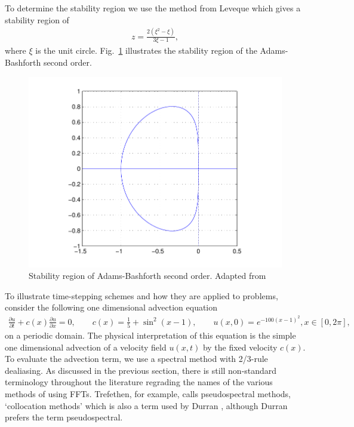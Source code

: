To determine the stability region we use the method from Leveque \cite{leveque} which gives a stability region of
\begin{align}
z = \frac{2(\xi^{2}-\xi)}{3\xi -1},
\end{align}
where $\xi$ is the unit circle. Fig.~\ref{ab_stab} illustrates the stability region of the Adams-Bashforth second order.
\begin{figure}
\begin{center}
\includegraphics[width=\textwidth]{ab_stab}
\caption{Stability region of Adams-Bashforth second order. Adapted from \cite{trefethen_spectral}}
\label{ab_stab}
\end{center}
\end{figure}

To illustrate time-stepping schemes and how they are applied to problems, consider the following one dimensional advection equation \cite{trefethen_spectral}
\begin{align}
\frac{\partial u}{\partial t} + c(x)\frac{\partial u}{\partial x} = 0,\qquad c(x)=\frac{1}{5}+\sin^{2}(x-1), \qquad u(x,0)=e^{-100(x-1)^{2}}, x\in[0,2\pi],
\end{align}
 on a periodic domain. The physical interpretation of this equation is the simple one dimensional advection of a velocity field $u(x,t)$ by the fixed velocity $c(x)$. To evaluate the advection term, we use a spectral method with 2/3-rule dealiasing. As discussed in the previous section, there is still non-standard terminology throughout the literature regrading the names of the various methods of using FFTs. Trefethen, for example, calls pseudospectral methods, `collocation methods' \cite{trefethen_spectral} which is also a term used by Durran \cite{durran}, although Durran prefers the term pseudospectral.  

